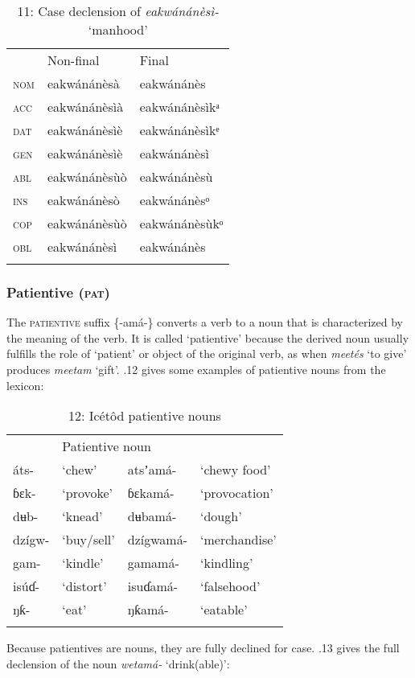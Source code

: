 \begin{table}
\caption{11: Case declension of \textit{eakwánánèsì-} ‘manhood’}
\label{tab:8}


\begin{tabularx}{\textwidth}{XXX} & Non-final & Final\\
\lsptoprule
\textsc{nom} & eakwánánèsà & eakwánánès\\
\textsc{acc} & eakwánánèsìà & eakwánánèsìkᵃ\\
\textsc{dat} & eakwánánèsìè & eakwánánèsìkᵉ\\
\textsc{gen} & eakwánánèsìè & eakwánánèsì\\
\textsc{abl} & eakwánánèsùò & eakwánánèsù\\
\textsc{ins} & eakwánánèsò & eakwánánèsᵒ\\
\textsc{cop} & eakwánánèsùò & eakwánánèsùkᵒ\\
\textsc{obl} & eakwánánèsì & eakwánánès\\
\lspbottomrule
\end{tabularx}
\end{table}

\subsubsection{Patientive (\textsc{pat})}

The \textsc{patientive} suffix \{-amá-\} converts a verb to a noun that is characterized by the meaning of the verb. It is called ‘patientive’ because the derived noun usually fulfills the role of ‘patient’ or object of the original verb, as when \textit{meetés} ‘to give’ produces \textit{meetam} ‘gift’. .12 gives some examples of patientive nouns from the lexicon:


\begin{table}
\caption{12: Icétôd patientive nouns}
\label{tab:8}


\begin{tabularx}{\textwidth}{XXXX}
\lsptoprule

\multicolumn{2}{X}{Verb root} & \multicolumn{2}{X}{Patientive noun}\\
áts- & ‘chew’ & atsʼamá- & ‘chewy food’\\
ɓɛk- & ‘provoke’ & ɓɛkamá- & ‘provocation’\\
dʉb- & ‘knead’ & dʉbamá- & ‘dough’\\
dzígw- & ‘buy/sell’ & dzígwamá- & ‘merchandise’\\
gam- & ‘kindle’ & gamamá- & ‘kindling’\\
isúɗ- & ‘distort’ & isuɗamá- & ‘falsehood’\\
ŋƙ- & ‘eat’ & ŋƙamá- & ‘eatable’\\
\lspbottomrule
\end{tabularx}
\end{table}
Because patientives are nouns, they are fully declined for case. .13 gives the full declension of the noun \textit{wetamá-} ‘drink(able)’:


